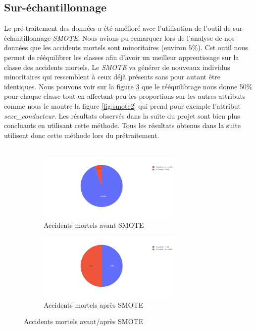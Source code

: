 \documentclass{article}
\begin{document}
    \subsection{Sur-échantillonnage}
    Le pré-traitement des données a été amélioré avec l'utilisation de l'outil de sur-échantillonnage \textit{SMOTE}.
    Nous avions pu remarquer lors de l'analyse de nos données que les accidents mortels sont minoritaires (environ $5\%$).
    Cet outil nous permet de rééquilibrer les classes afin d'avoir un meilleur apprentissage sur la classe des accidents 
    mortels. Le \textit{SMOTE} va générer de nouveaux individus minoritaires qui ressemblent à ceux déjà présents sans 
    pour autant être identiques.
    Nous pouvons voir sur la figure \ref{fig:smote1} que le rééquilibrage nous donne 50\% pour chaque classe 
    tout en affectant peu les proportions sur les autres attributs comme nous le montre la figure \ref{fig:smote2} 
    qui prend pour exemple l'attribut \textit{sexe\_conducteur}.
    Les résultats observés dans la suite du projet sont bien plus concluants en utilisant cette méthode.
    Tous les résultats obtenus dans la suite utilisent donc cette méthode lors du prétraitement.
    \\\\
    \begin{figure}[!h]
        \vspace{2cm}
        \centering
        \begin{subfigure}{7cm}
            \includegraphics[width=7cm]{./img/smote/before.png}
            \caption{Accidents mortels avant SMOTE}\label{fig:before_smote}
        \end{subfigure}
        \hspace{0.2cm}
        \begin{subfigure}{7cm}
            \includegraphics[width=7cm]{./img/smote/after.png}
        \caption{Accidents mortels après SMOTE}\label{fig:after_smote}
        \end{subfigure}
        \caption{Accidents mortels avant/après SMOTE}\label{fig:smote1}
    \end{figure}
\end{document}
